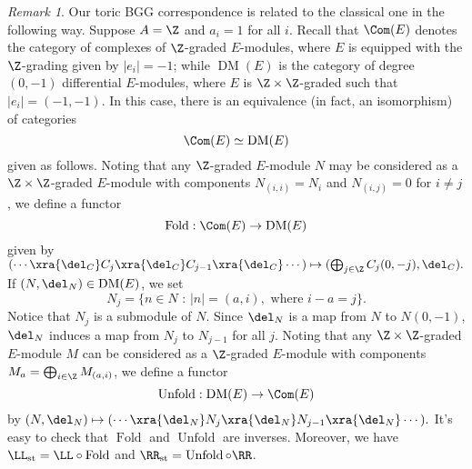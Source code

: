 \documentclass[12pt]{amsart}
\theoremstyle{definition}
\theoremstyle{remark}
\newtheorem{remark}[lemma]{Remark}
\newcommand{\michael}[1]{{\color{red} \sf $\clubsuit\clubsuit\clubsuit$ Michael: [#1]}}
\def\on{\operatorname}
\def\DM{\operatorname{DM}}
\begin{document}
\begin{remark}\label{rmk:PPn DM is complexes}
Our toric BGG correspondence is related to the classical one in the following way. Suppose $A = \Z$ and $a_i = 1$ for all $i$. Recall that $\Com(E)$ denotes the category of complexes of $\Z$-graded $E$-modules, where $E$ is equipped with the $\Z$-grading given by $|e_i| = -1$; while $\DM(E)$ is the category of degree $(0, -1)$ differential $E$-modules, where $E$ is $\Z \times \Z$-graded such that $|e_i| = (-1, -1)$. In this case, there is an equivalence (in fact, an isomorphism) of categories
$$
\Com(E) \simeq \DM(E)
$$
given as follows. Noting that any $\Z$-graded $E$-module $N$ may be considered as a $\Z \times \Z$-graded $E$-module with components $N_{(i, i)} = N_i$ and $N_{(i, j)} = 0$ for $i \ne j$, we define a functor
$$
\on{Fold} : \Com(E) \to \DM(E)
$$
given by $(\cdots \xra{\del_C} C_j \xra{\del_C} C_{j-1} \xra{\del_C} \cdots) \mapsto (\bigoplus_{j \in \Z} C_j(0, -j), \del_C).$ If $(N, \del_N) \in \DM(E)$, we set
$$
N_j = \{n \in N \text{ : } |n| = (a, i), \text{ where } i - a = j\}.
$$
Notice that $N_j$ is a submodule of $N$. Since $\del_N$ is a map from $N$ to $N(0, -1)$, $\del_N$ induces a map from $N_j$ to $N_{j -1}$ for all $j$. Noting that any $\Z \times \Z$-graded $E$-module $M$ can be considered as a $\Z$-graded $E$-module with components $M_a = \bigoplus_{i  \in \Z} M_{(a, i)}$, we define a functor
$$
\on{Unfold} : \DM(E) \to \Com(E)
$$
by $(N, \del_N) \mapsto (\cdots \xra{\del_N} N_j \xra{\del_N} N_{j-1} \xra{\del_N} \cdots ).$ It's easy to check that $\on{Fold}$ and $\on{Unfold}$ are inverses. Moreover, we have $\LL_{\on{st}} = \LL \circ \on{Fold}$ and $\RR_{\on{st}} = \on{Unfold} \circ \RR$.
\end{remark}
\iffalse
In this case, the functors $\LL$ and $\RR$ are related to the classical BGG functors $\LL_{\on{st}}$ and $\RR_{\on{st}}$ in the following way. 

Any 
There is a functor
$$
\on{Fold} : \Com(E) \to \DM(E)
$$
given by sending a complex $C$ to the differential module $(\bigoplus_{j \in \Z} C_j(0, -j), \del_C)$, where the $C_j$ are considered as $\Z \times \Z$-graded $E$-modules. It's easy to check that $\LL_{\on{st}} = \LL \circ \on{Fold}$.

The functor $\on{Fold}$ is not an equivalence \michael{give a proof of this?}, but it induces an equivalence
$$
\Com_{\on{Free}}(E) \xra{\simeq} \DM_{\on{Free}}(E)
$$
on full subcategories given by objects whose underlying modules are free. The inverse 
$$
\on{Unfold} : \DM_{\on{Free}}(E) \to \Com_{\on{Free}}(E)
$$
is given as follows. Let $(N, \del_N) \in \DM^{\on{Free}}(E)$, and write $N = \bigoplus_{(a, i) \in \Z \times \Z} E(a, i)^{\oplus r_{a,i}}$. The associated complex $C$ is given by $C_j = \bigoplus_{a - i = j} E(a)^{\oplus r_{a,i}}$, with differential induced by $\del_N$. Notice that, since every element of $E$ has degree $(-d,-d)$ for some $0 \leq d\leq n$, and $\del_N$ is a map from $N$ to $N(0, -1)$, each summand $E(a,i)$ can only map to summands of the form $E(a-d,i-d+1)$ for some $0\leq d \leq n$.  It follows that the differential maps each $C_j$ to $C_{j-1}$. Finally, observe that $\RR_{\on{st}} = \on{Unfold} \circ \RR$.
\fi
\end{document}
